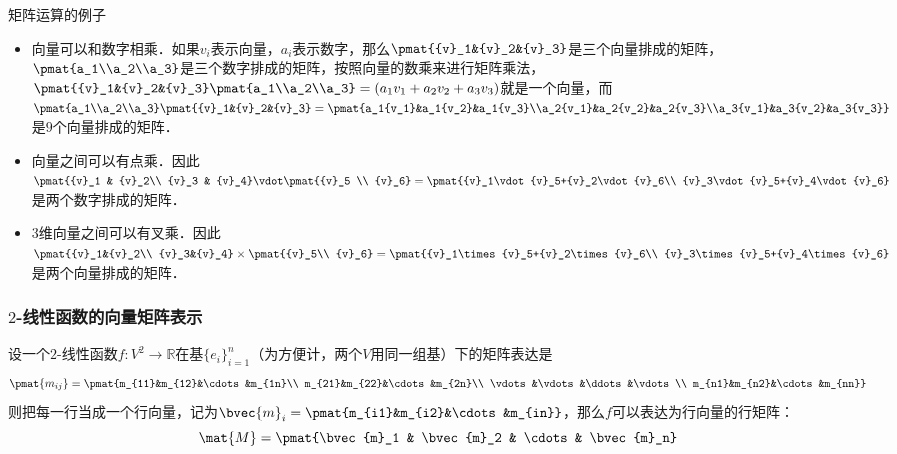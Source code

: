 \begin{example}{矩阵运算的例子}

\begin{itemize}
%
\item 向量可以和数字相乘．如果${v}_i$表示向量，$a_i$表示数字，那么$\pmat{{v}_1&{v}_2&{v}_3}$是三个向量排成的矩阵，$\pmat{a_1\\a_2\\a_3}$是三个数字排成的矩阵，按照向量的数乘来进行矩阵乘法，$\pmat{{v}_1&{v}_2&{v}_3}\pmat{a_1\\a_2\\a_3}=(a_1{v}_1+a_2{v}_2+a_3{v}_3)$就是一个向量，而$\pmat{a_1\\a_2\\a_3}\pmat{{v}_1&{v}_2&{v}_3}=\pmat{a_1{v_1}&a_1{v_2}&a_1{v_3}\\a_2{v_1}&a_2{v_2}&a_2{v_3}\\a_3{v_1}&a_3{v_2}&a_3{v_3}}$是$9$个向量排成的矩阵．
\item 向量之间可以有点乘．因此 $\pmat{{v}_1 & {v}_2\\ {v}_3 & {v}_4}\vdot \pmat{{v}_5 \\ {v}_6}=\pmat{{v}_1\vdot{v}_5+{v}_2\vdot{v}_6\\ {v}_3\vdot{v}_5+{v}_4\vdot{v}_6}$ 是两个数字排成的矩阵．
\item 3维向量之间可以有叉乘．因此 $\pmat{{v}_1&{v}_2\\ {v}_3&{v}_4}\times\pmat{{v}_5\\ {v}_6}=\pmat{{v}_1\times{v}_5+{v}_2\times{v}_6\\ {v}_3\times{v}_5+{v}_4\times{v}_6}$ 是两个向量排成的矩阵．
\end{itemize}
\end{example}


\subsubsection{$2$-线性函数的向量矩阵表示}

设一个$2$-线性函数$f:V^2\rightarrow\mathbb{R}$在基$\{{e}_i\}_{i=1}^n$（为方便计，两个$V$用同一组基）下的矩阵表达是
\begin{equation}
\pmat{m_{ij}}=\pmat{m_{11}&m_{12}&\cdots&m_{1n}\\ m_{21}&m_{22}&\cdots&m_{2n}\\ \vdots&\vdots&\ddots&\vdots\\ m_{n1}&m_{n2}&\cdots&m_{nn}}
\end{equation}
则把每一行当成一个行向量，记为$\bvec {m}_i = \pmat{m_{i1}&m_{i2}&\cdots&m_{in}}$，那么$f$可以表达为行向量的行矩阵：
\begin{equation}\label{Tensor_eq3}
\mat{M}=\pmat{\bvec{m}_1 & \bvec{m}_2 & \cdots & \bvec{m}_n}
\end{equation}

